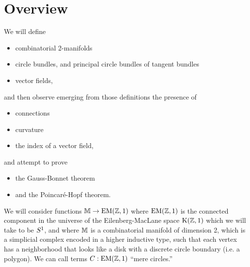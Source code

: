 \section{Overview}

We will define 
\begin{itemize}
\item combinatorial 2-manifolds
\item circle bundles, and principal circle bundles of tangent bundles
\item vector fields,
\end{itemize}
and then observe emerging from those definitions the presence of
\begin{itemize}
\item connections
\item curvature
\item the index of a vector field,
\end{itemize}
and attempt to prove
\begin{itemize}
\item the Gauss-Bonnet theorem
\item and the Poincaré-Hopf theorem.
\end{itemize}

We will consider functions \( \mathbb{M}\to \mathrm{EM}(\mathbb{Z},1) \) where \( \mathrm{EM}(\mathbb{Z},1) \) is the connected component in the universe of the Eilenberg-MacLane space \( \mathrm{K}(\mathbb{Z},1) \) which we will take to be \( S^1 \), and where \( \mathbb{M} \) is a combinatorial manifold of dimension 2, which is a simplicial complex encoded in a higher inductive type, such that each vertex has a neighborhood that looks like a disk with a discrete circle boundary (i.e. a polygon). We can call terms \( C:\mathrm{EM}(\mathbb{Z},1) \) ``mere circles.''

